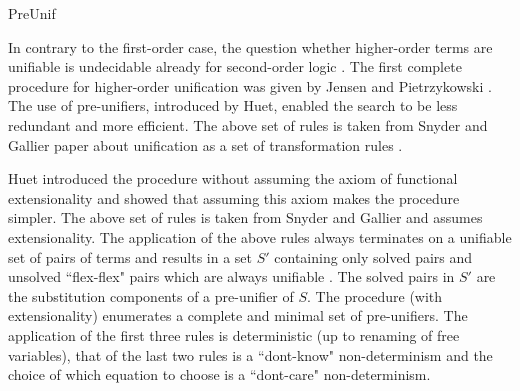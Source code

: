 \begin{entry}{PreUnif}
 \begin{history}
   In contrary to the first-order case,
   the question whether higher-order terms are unifiable is
   undecidable already for second-order logic \cite{goldfarb81tcs}.
   The first complete procedure for higher-order unification was given by
   Jensen and Pietrzykowski \cite{jensen76tcs}.
   The use of pre-unifiers, introduced by Huet, enabled the search to
   be less redundant and more efficient.
   The above set of rules is taken from Snyder and Gallier paper about unification
   as a set of transformation rules \cite{Snyder1989101}.
 \end{history}

\begin{technicalities}
  Huet \cite{huet75tcs} introduced the procedure without assuming
  the axiom of functional extensionality and showed that assuming this axiom
  makes the procedure simpler.
  The above set of rules is taken from Snyder and Gallier \cite{Snyder1989101}
  and assumes extensionality.
   The application of the above rules always terminates on a unifiable set of pairs of terms
   and results in a set $S'$ containing only solved pairs and unsolved ``flex-flex"
  pairs which are always unifiable .
   The solved pairs in $S'$ are the substitution components \cite{Robinson1965JACM} of a pre-unifier of $S$.
   The procedure (with extensionality) enumerates a complete and minimal set of pre-unifiers.
  The application of the first three rules is deterministic (up to renaming of free variables),
  that of the last two rules is
  a ``dont-know" non-determinism and  the choice of which equation to choose
  is a ``dont-care" non-determinism.
 \end{technicalities}



%
%
%
%
%
%
%
%




\end{entry}
